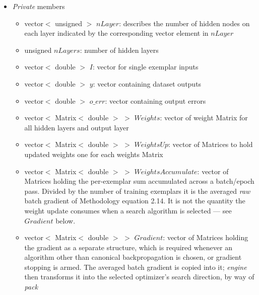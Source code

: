 \documentclass{report}
\begin{document}
\begin{itemize}
\begin{itemize}
      {\bf Cost and contract.} Constant, non-virtual, inline; it allocates
      nothing, copies nothing, and adds no dispatch. No production code path
      calls it, so it cannot appear in a per-exemplar or per-element loop.
      Because the reference is to a member of this object, it remains valid
      only while the object does, and it must not be retained across a call
      to setHidden() or removeInputs(), both of which resize the Matrices it
      refers to.
\end{itemize}

\item {\em Private} members

\begin{itemize}
\item vector$<$ unsigned $>$ $nLayer$: describes the number of hidden
      nodes on each layer indicated by the corresponding vector
      element in $nLayer$
\item unsigned $nLayers$: number of hidden layers
\item vector$<$ double $>$ $I$: vector for single exemplar inputs
\item vector$<$ double $>$ $y$: vector containing dataset outputs
\item vector$<$ double $>$ $o\_err$: vector containing output errors
\item vector$<$ Matrix$<$ double $>$ $>$ $Weights$: vector of weight
      Matrix for all hidden layers and output layer
\item vector$<$ Matrix$<$ double $>$ $>$ $WeightsUp$: vector of
      Matrices to hold updated weights one for each weights Matrix
\item vector$<$ Matrix$<$ double $>$ $>$ $WeightsAccumulate$: vector
      of Matrices holding the per-exemplar sum accumulated across a
      batch/epoch pass.  Divided by the
      number of training exemplars it is the averaged {\em raw} batch
      gradient of Methodology equation 2.14.  It is not the quantity the
      weight update consumes when a search algorithm is selected --- see
      $Gradient$ below.
\item vector$<$ Matrix$<$ double $>$ $>$ $Gradient$: vector of Matrices
      holding the gradient as a separate structure, which is required
      whenever an algorithm other than canonical backpropagation is
      chosen, or gradient stopping is armed.  The averaged batch
      gradient is copied into it; {\em engine} then transforms it into
      the selected optimizer's search direction, by way of {\em pack}

\end{itemize}
\end{itemize}
\end{document}
